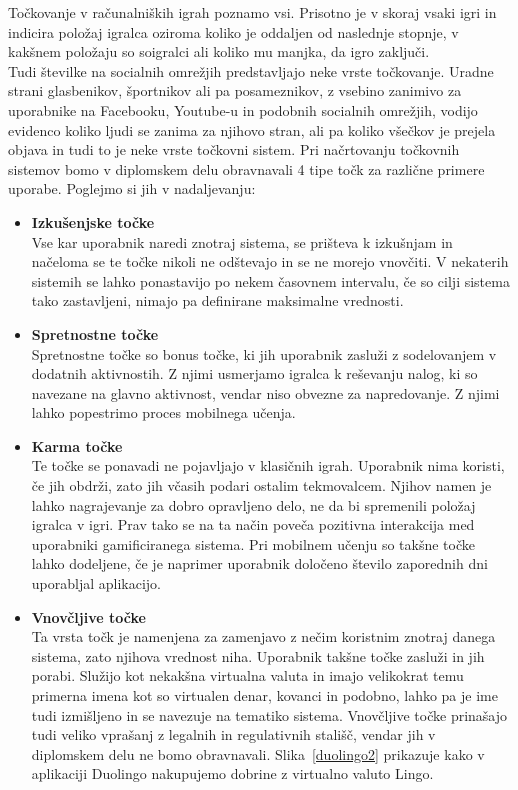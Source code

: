 \documentclass[a4paper, 12pt]{book}
\begin{document}
Točkovanje v računalniških igrah poznamo vsi. Prisotno je v skoraj vsaki igri in indicira položaj igralca oziroma koliko je oddaljen od naslednje stopnje, v kakšnem položaju so soigralci ali koliko mu manjka, da igro zaključi.\\
Tudi številke na socialnih omrežjih predstavljajo neke vrste točkovanje. Uradne strani glasbenikov, športnikov ali pa posameznikov, z vsebino zanimivo za uporabnike na Facebooku, Youtube-u in podobnih socialnih omrežjih, vodijo evidenco koliko ljudi se zanima za njihovo stran, ali pa koliko všečkov je prejela objava in tudi to je neke vrste točkovni sistem.
Pri načrtovanju točkovnih sistemov bomo v diplomskem delu obravnavali 4 tipe točk za različne primere uporabe. Poglejmo si jih v nadaljevanju:
\begin{itemize}
\item \textbf{Izkušenjske točke}\\
Vse kar uporabnik naredi znotraj sistema, se prišteva k izkušnjam in načeloma se te točke nikoli ne odštevajo in se ne morejo vnovčiti. V nekaterih sistemih se lahko ponastavijo po nekem časovnem intervalu, če so cilji sistema tako zastavljeni, nimajo pa definirane maksimalne vrednosti.

\item \textbf{Spretnostne točke}\\
Spretnostne točke so bonus točke, ki jih uporabnik zasluži z sodelovanjem v dodatnih aktivnostih. Z njimi usmerjamo igralca k reševanju nalog, ki so navezane na glavno aktivnost, vendar niso obvezne za napredovanje. Z njimi lahko popestrimo proces mobilnega učenja. 

\item \textbf{Karma točke}\\
Te točke se ponavadi ne pojavljajo v klasičnih igrah. Uporabnik nima koristi, če jih obdrži, zato jih včasih podari ostalim tekmovalcem.  Njihov namen je lahko nagrajevanje za dobro opravljeno delo, ne da bi spremenili položaj igralca v igri. Prav tako se na ta način poveča pozitivna interakcija med uporabniki gamificiranega sistema. Pri mobilnem učenju so takšne točke lahko dodeljene, če je naprimer uporabnik določeno število zaporednih dni uporabljal aplikacijo.

\item \textbf{Vnovčljive točke}\\
Ta vrsta točk je namenjena za zamenjavo z nečim koristnim znotraj danega sistema, zato njihova vrednost niha. Uporabnik takšne točke zasluži in jih porabi. Služijo kot nekakšna virtualna valuta in imajo velikokrat temu primerna imena kot so virtualen denar, kovanci in podobno, lahko pa je ime tudi izmišljeno in se navezuje na tematiko sistema. Vnovčljive točke prinašajo tudi veliko vprašanj z legalnih in regulativnih stališč, vendar jih v diplomskem delu ne bomo obravnavali. Slika~\ref{duolingo2} prikazuje kako v aplikaciji Duolingo nakupujemo dobrine z virtualno valuto Lingo.
\end{itemize}
\end{document}

